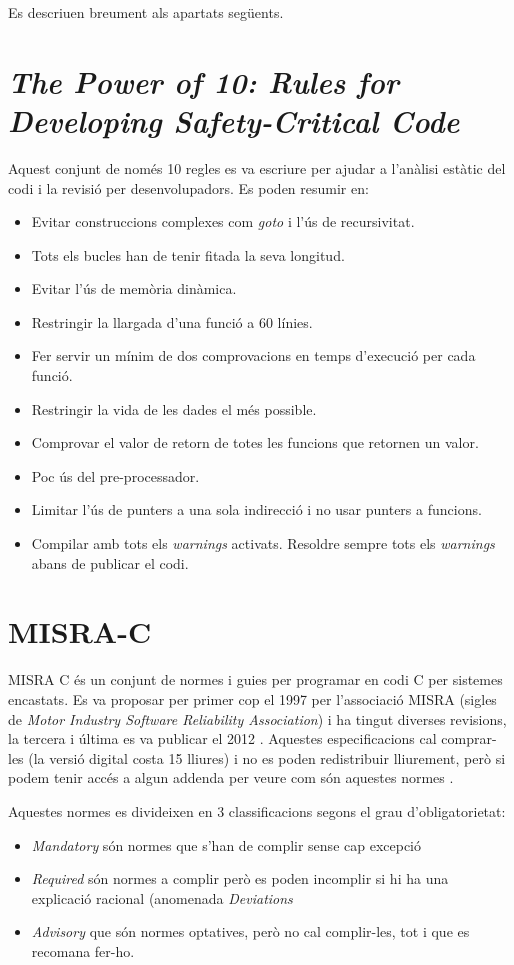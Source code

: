 Es descriuen breument als apartats següents.

\section{\em The Power of 10: Rules for Developing Safety-Critical Code}
Aquest conjunt de només 10 regles es va escriure per ajudar a l'anàlisi estàtic del codi i la revisió per desenvolupadors. Es poden resumir en:
\begin{itemize}
 \item Evitar construccions complexes com {\em goto} i l'ús de recursivitat.
 \item Tots els bucles han de tenir fitada la seva longitud.
 \item Evitar l'ús de memòria dinàmica.
 \item Restringir la llargada d'una funció a 60 línies.
 \item Fer servir un mínim de dos comprovacions en temps d'execució per cada funció.
 \item Restringir la vida de les dades el més possible.
 \item Comprovar el valor de retorn de totes les funcions que retornen un valor.
 \item Poc ús del pre-processador.
 \item Limitar l'ús de punters a una sola indirecció i no usar punters a funcions.
 \item Compilar amb tots els {\em warnings} activats. Resoldre sempre tots els {\em warnings} abans de publicar el codi.
\end{itemize}


\section{MISRA-C}
\label{sec:MISRA}
MISRA C és un conjunt de normes i guies per programar en codi C per sistemes encastats. Es va proposar per primer cop el 1997 per l'associació MISRA (sigles de {\em Motor Industry Software Reliability Association}) i ha tingut diverses revisions, la tercera i última es va publicar el 2012 \cite{MISRAHomepage}\cite{MISRAC2012}.
Aquestes especificacions cal comprar-les (la versió digital costa 15 lliures) i no es poden redistribuir lliurement, però si podem tenir accés a algun addenda per veure com són aquestes normes \cite{MISRAAmend}.

Aquestes normes es divideixen en 3 classificacions segons el grau d'obligatorietat:
\begin{itemize}
 \item {\em Mandatory} són normes que s'han de complir sense cap excepció
 \item {\em Required} són normes a complir però es poden incomplir si hi ha una explicació racional (anomenada {\em Deviations}
 \item {\em Advisory} que són normes optatives, però no cal complir-les, tot i que es recomana fer-ho.
\end{itemize}

